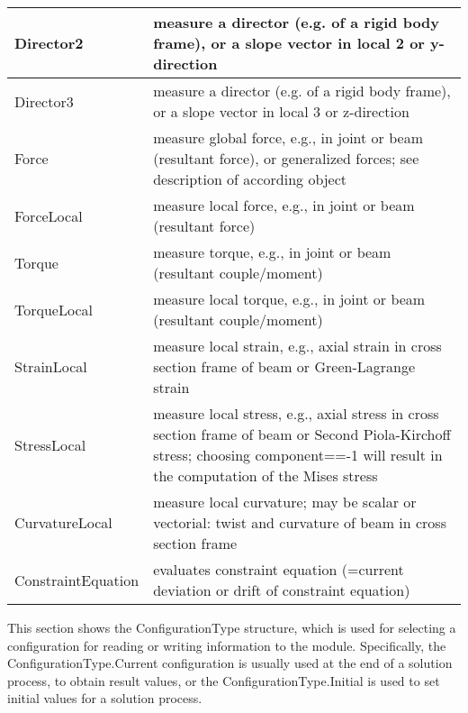 \begin{center}
\begin{longtable}{| p{8cm} | p{8cm} |}
  Director2 & measure a director (e.g. of a rigid body frame), or a slope vector in local 2 or y-direction\\ \hline 
  Director3 & measure a director (e.g. of a rigid body frame), or a slope vector in local 3 or z-direction\\ \hline 
  Force & measure global force, e.g., in joint or beam (resultant force), or generalized forces; see description of according object\\ \hline 
  ForceLocal & measure local force, e.g., in joint or beam (resultant force)\\ \hline 
  Torque & measure torque, e.g., in joint or beam (resultant couple/moment)\\ \hline 
  TorqueLocal & measure local torque, e.g., in joint or beam (resultant couple/moment)\\ \hline 
  StrainLocal & measure local strain, e.g., axial strain in cross section frame of beam or Green-Lagrange strain\\ \hline 
  StressLocal & measure local stress, e.g., axial stress in cross section frame of beam or Second Piola-Kirchoff stress; choosing component==-1 will result in the computation of the Mises stress\\ \hline 
  CurvatureLocal & measure local curvature; may be scalar or vectorial: twist and curvature of beam in cross section frame\\ \hline 
  ConstraintEquation & evaluates constraint equation (=current deviation or drift of constraint equation)\\ \hline 
\end{longtable}
\end{center}

\label{sec:ConfigurationType}
This section shows the ConfigurationType structure, which is used for selecting a configuration for reading or writing information to the module. Specifically, the ConfigurationType.Current configuration is usually used at the end of a solution process, to obtain result values, or the ConfigurationType.Initial is used to set initial values for a solution process.



